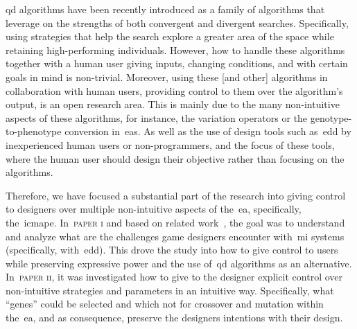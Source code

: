 
\acrshort{qd} algorithms have been recently introduced as a family of algorithms that leverage on the strengths of both convergent and divergent searches. Specifically, using strategies that help the search explore a greater area of the space while retaining high-performing individuals. However, how to handle these algorithms together with a human user giving inputs, changing conditions, and with certain goals in mind is non-trivial. Moreover, using these [and other] algorithms in collaboration with human users, providing control to them over the algorithm's output, is an open research area. This is mainly due to the many non-intuitive aspects of these algorithms, for instance, the variation operators or the genotype-to-phenotype conversion in~\acrlong{ea}s. As well as the use of design tools such as~\acrshort{edd} by inexperienced human users or non-programmers, and the focus of these tools, where the human user should design their objective rather than focusing on the algorithms.

Therefore, we have focused a substantial part of the research into giving control to designers over multiple non-intuitive aspects of the~\acrshort{ea}, specifically, the~\acrfull{icmape}. In~\textsc{paper i} and based on related work~\cite{Baldwin2017}, the goal was to understand and analyze what are the challenges game designers encounter with~\acrshort{mi} systems (specifically, with~\acrshort{edd}). This drove the study into how to give control to users while preserving expressive power and the use of~\acrshort{qd} algorithms as an alternative. In~\textsc{paper ii}, it was investigated how to give to the designer explicit control over non-intuitive strategies and parameters in an intuitive way. Specifically, what ``genes'' could be selected and which not for crossover and mutation within the~\acrshort{ea}, and as consequence, preserve the designers intentions with their design. 

